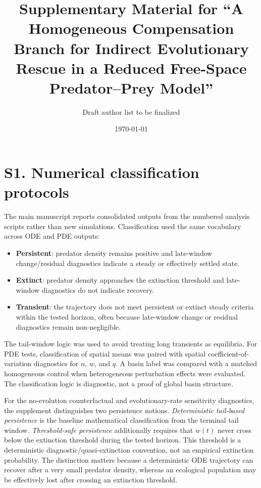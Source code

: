 \documentclass[11pt]{article}
\title{Supplementary Material for ``A Homogeneous Compensation Branch for Indirect Evolutionary Rescue in a Reduced Free-Space Predator--Prey Model''}
\author{Draft author list to be finalized}
\date{\today}
\begin{document}
\maketitle

\section*{S1. Numerical classification protocols}

The main manuscript reports consolidated outputs from the numbered analysis scripts rather than new simulations. Classification used the same vocabulary across ODE and PDE outputs:
\begin{itemize}
  \item \textbf{Persistent}: predator density remains positive and late-window change/residual diagnostics indicate a steady or effectively settled state.
  \item \textbf{Extinct}: predator density approaches the extinction threshold and late-window diagnostics do not indicate recovery.
  \item \textbf{Transient}: the trajectory does not meet persistent or extinct steady criteria within the tested horizon, often because late-window change or residual diagnostics remain non-negligible.
\end{itemize}

The tail-window logic was used to avoid treating long transients as equilibria. For PDE tests, classification of spatial means was paired with spatial coefficient-of-variation diagnostics for \(n\), \(w\), and \(q\). A basin label was compared with a matched homogeneous control when heterogeneous perturbation effects were evaluated. The classification logic is diagnostic, not a proof of global basin structure.

For the no-evolution counterfactual and evolutionary-rate sensitivity diagnostics, the supplement distinguishes two persistence notions. \emph{Deterministic tail-based persistence} is the baseline mathematical classification from the terminal tail window. \emph{Threshold-safe persistence} additionally requires that \(w(t)\) never cross below the extinction threshold during the tested horizon. This threshold is a deterministic diagnostic/quasi-extinction convention, not an empirical extinction probability. The distinction matters because a deterministic ODE trajectory can recover after a very small predator density, whereas an ecological population may be effectively lost after crossing an extinction threshold.
\end{document}
